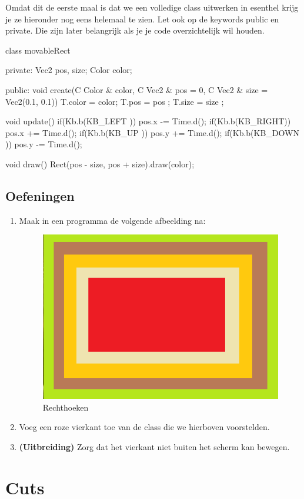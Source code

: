 Omdat dit de eerste maal is dat we een volledige class uitwerken in esenthel krijg je ze hieronder nog eens helemaal te zien. Let ook op de keywords public en private. Die zijn later belangrijk als je je code overzichtelijk wil houden.

\begin{code}
class movableRect {
private:
  Vec2 pos, size;
	Color color;
	
public:
  void create(C Color & color, C Vec2 & pos = 0, C Vec2 & size = Vec2(0.1, 0.1)) {
	  T.color = color;
		T.pos   = pos  ;
		T.size  = size ;
	}
	
	void update() {
		if(Kb.b(KB_LEFT )) pos.x -= Time.d();
		if(Kb.b(KB_RIGHT)) pos.x += Time.d();
		if(Kb.b(KB_UP   )) pos.y += Time.d();
		if(Kb.b(KB_DOWN )) pos.y -= Time.d();
	}
	
	void draw() {
		Rect(pos - size, pos + size).draw(color);
	}
}
\end{code}
	
\subsection{Oefeningen}

\begin{enumerate}
\item Maak in een programma de volgende afbeelding na:

\begin{figure}[h]
\centering
\includegraphics[width=0.4\linewidth]{../images/nested_rectangles}
\caption[]{Rechthoeken}
\label{fig:nested_rect}
\end{figure}

\item Voeg een roze vierkant toe van de class  die we hierboven voorstelden.
\item \textbf{(Uitbreiding)} Zorg dat het vierkant niet buiten het scherm kan bewegen.
\end{enumerate}

\section{Cuts}

